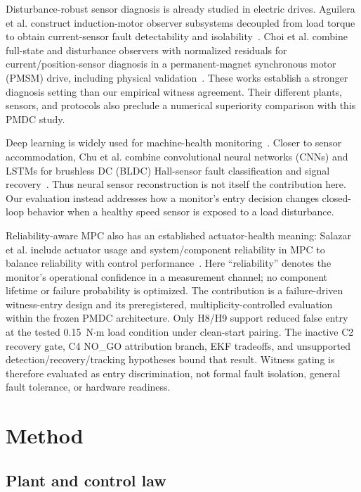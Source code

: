 \documentclass[conference]{IEEEtran}
\begin{document}
Disturbance-robust sensor diagnosis is already studied in electric drives.
Aguilera et al. construct induction-motor observer subsystems decoupled
from load torque to obtain current-sensor fault detectability and
isolability~\cite{Aguilera2016}. Choi et al. combine full-state and
disturbance observers with normalized residuals for current/position-sensor
diagnosis in a permanent-magnet synchronous motor (PMSM) drive, including
physical validation~\cite{Choi2021}.
These works establish a stronger diagnosis setting than our empirical
witness agreement. Their different plants, sensors, and protocols also
preclude a numerical superiority comparison with this PMDC study.

Deep learning is widely used for machine-health monitoring~\cite{Zhao2019}.
Closer to sensor accommodation, Chu et al. combine convolutional neural
networks (CNNs) and LSTMs for brushless DC (BLDC) Hall-sensor fault
classification and signal recovery~\cite{Chu2023}.
Thus neural sensor reconstruction is not itself the contribution here.
Our evaluation instead addresses how a monitor's entry decision changes
closed-loop behavior when a healthy speed sensor is exposed to a load
disturbance.

Reliability-aware MPC also has an established actuator-health meaning:
Salazar et al. include actuator usage and system/component reliability in
MPC to balance reliability with control performance~\cite{Salazar2017}.
Here ``reliability'' denotes the monitor's operational confidence in a
measurement channel; no component lifetime or failure probability is
optimized. The contribution is a failure-driven witness-entry design and
its preregistered, multiplicity-controlled evaluation within the frozen
PMDC architecture. Only H8/H9 support reduced false entry at the tested
0.15~N$\cdot$m load condition under clean-start pairing. The inactive C2
recovery gate, C4 NO\_GO attribution branch, EKF tradeoffs, and unsupported
detection/recovery/tracking hypotheses bound that result. Witness gating
is therefore evaluated as entry discrimination, not formal fault
isolation, general fault tolerance, or hardware readiness.

\section{Method}
\label{sec:method}

\subsection{Plant and control law}
\label{sec:plant}
\end{document}
